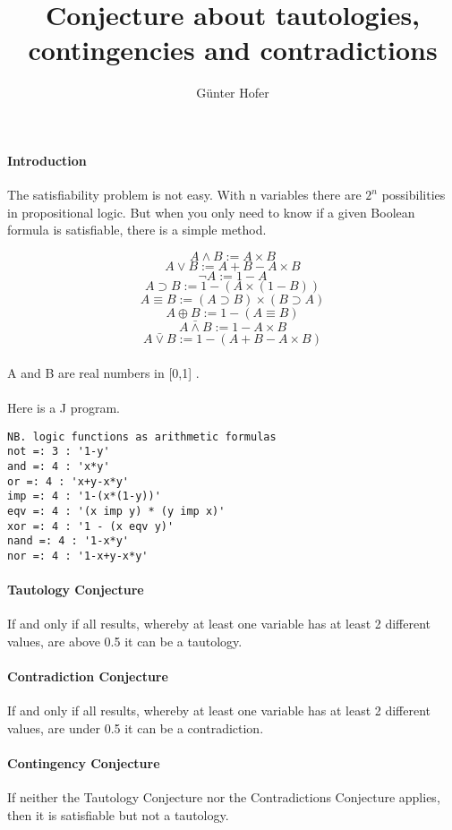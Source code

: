\documentclass[12pt,a4paper]{article}
\begin{document}
\title{Conjecture about tautologies, contingencies
and contradictions}
\author{Günter Hofer}
\maketitle
\newpage 
\paragraph{Introduction}
The satisfiability problem is not easy. With n variables there are $2^n$ possibilities in propositional logic. But when you only need to know if a given Boolean formula
is satisfiable, there is a simple method.


\[A \land B := A \times B\]
\[A \lor B 		:= A + B - A \times B\]
\[\lnot A := 1 - A\]
\[A \supset B := 1 - (A \times (1 - B))\]
\[A \equiv B := (A \supset B) \times (B \supset A) \]
\[A \oplus B := 1 - (A \equiv B)\]
\[A \bar{\land} B := 1- A \times B\]
\[A \bar{\lor}B := 1 - (A + B - A \times B)\]
\paragraph{}
A and B are real numbers in [0,1] .
\paragraph{}
Here is a J program.
\begin{verbatim}
NB. logic functions as arithmetic formulas
not =: 3 : '1-y'
and =: 4 : 'x*y'
or =: 4 : 'x+y-x*y'
imp =: 4 : '1-(x*(1-y))'
eqv =: 4 : '(x imp y) * (y imp x)'
xor =: 4 : '1 - (x eqv y)'
nand =: 4 : '1-x*y'
nor =: 4 : '1-x+y-x*y'
\end{verbatim}

\paragraph{Tautology Conjecture}
If and only if all results, whereby at least one variable has at least 2 different values, are above 0.5 it can be a tautology.

\paragraph{Contradiction Conjecture}
If and only if all results, whereby at least one variable has at least 2 different values, are under 0.5 it can be a contradiction.

\paragraph{Contingency Conjecture}
If neither the Tautology Conjecture nor the Contradictions Conjecture applies, then it is satisfiable but not a tautology.
\newpage 
\end{document}
